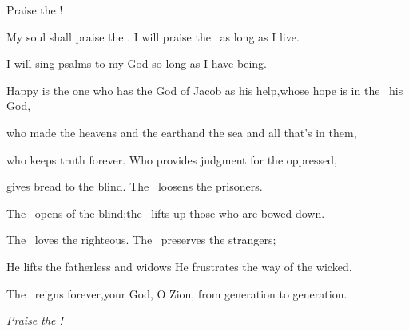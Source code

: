 
\begin{inparaenum}
  \pa{} Praise the \lord!%

  \pc{}My soul shall praise the \lord.\pa{} I will praise the \lord\ as long as I live.%

  \pb{}I will sing psalms to my God so long as I have being.%

  \pa{} Happy is the one who has the God of Jacob as his help,\pa{}whose hope is in the \lord\ his God,%

  \pa{} who made the heavens and the earth\pa{}and the sea and all that's in them,%

  \pb{}who keeps%
  truth forever.  Who provides judgment for the oppressed,%

  \pb{}gives bread to the blind.%
  \pa{}The \lord\ loosens the prisoners.%

  \pa{} The \lord\ opens  of the blind;\pa{}the \lord\ lifts up those who are bowed down.%

  \pb{}The \lord\ loves the righteous.  The \lord\ preserves the strangers;%

  \pb{}He lifts the fatherless and widows%
  \pa{}He frustrates the way of the wicked.%

  \pa{} The \lord\ reigns forever,\pa{}your God, O Zion, from generation to generation.%

  \pa{}\textit{Praise the \lord!}%
\end{inparaenum}
